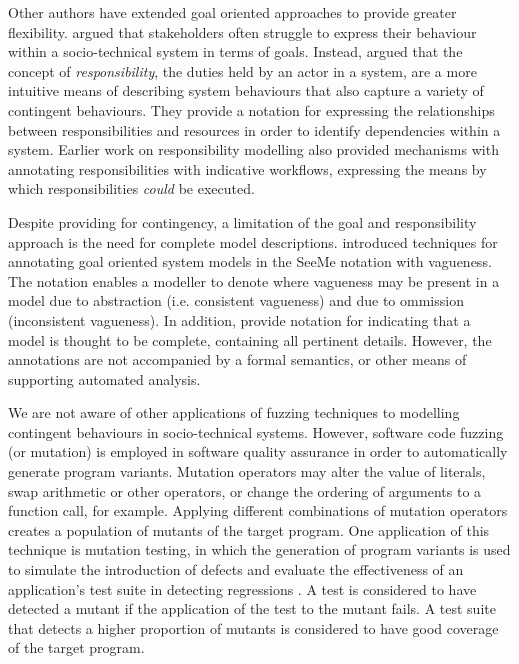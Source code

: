 \documentclass{sig-alternate}
\begin{document}
Other authors have extended goal oriented approaches to provide greater
flexibility.  \citet{sommerville09deriving} argued that stakeholders often
struggle to express their behaviour within a socio-technical system in terms of
goals.  Instead, \citet{sommerville09deriving} argued that the concept of
\emph{responsibility}, the duties held by an actor in a system, are a more
intuitive means of describing system behaviours that also capture a variety of
contingent behaviours.  They provide a notation for expressing the relationships
between responsibilities and resources in order to identify dependencies within
a system.  Earlier work on responsibility modelling also provided mechanisms
with annotating responsibilities with indicative workflows, expressing the means
by which responsibilities \emph{could} be executed.

Despite providing for contingency, a limitation of the goal and responsibility
approach is the need for complete model descriptions. \citet{Herrmann1999}
introduced techniques for annotating goal oriented system models in the SeeMe
notation with vagueness.  The notation enables a modeller to denote where
vagueness may be present in a model due to abstraction (i.e. consistent
vagueness) and due to ommission (inconsistent vagueness).  In addition,
\citeauthor{Herrmann1999} provide notation for indicating that a model is
thought to be complete, containing all pertinent details.  However, the
annotations are not accompanied by a formal semantics, or other means of
supporting automated analysis.

We are not aware of other applications of fuzzing techniques to modelling
contingent behaviours in socio-technical systems.  However, software code
fuzzing (or mutation) is employed in software quality assurance in order to
automatically generate program variants.  Mutation operators may alter the value
of literals, swap arithmetic or other operators, or change the ordering of
arguments to a function call, for example.  Applying different combinations of
mutation operators creates a population of mutants of the target program.  One
application of this technique is mutation testing, in which the generation of
program variants is used to simulate the introduction of defects and evaluate
the effectiveness of an application's test suite in detecting regressions
\citep{demillo78hints}.  A test is considered to have detected a mutant if the
application of the test to the mutant fails.  A test suite that detects a higher
proportion of mutants is considered to have good coverage of the target program.
\end{document}
